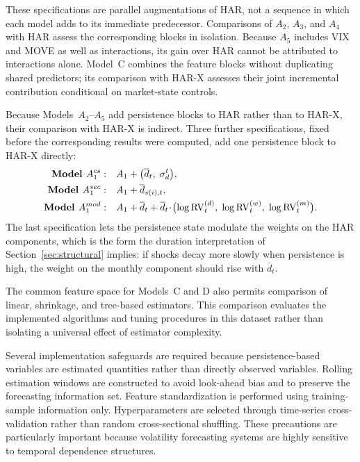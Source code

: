 \documentclass[jrfm,article,submit,moreauthors,pdftex]{Definitions/mdpi}
\begin{document}
These specifications are parallel augmentations of HAR, not a sequence in
which each model adds to its immediate predecessor. Comparisons of $A_2$,
$A_3$, and $A_4$ with HAR assess the corresponding blocks in isolation.
Because $A_5$ includes VIX and MOVE as well as interactions, its gain over
HAR cannot be attributed to interactions alone. Model~C combines the
feature blocks without duplicating shared predictors; its comparison with
HAR-X assesses their joint incremental contribution conditional on
market-state controls.

Because Models~$A_2$--$A_5$ add persistence blocks to HAR rather than to
HAR-X, their comparison with HAR-X is indirect. Three further
specifications, fixed before the corresponding results were computed, add
one persistence block to HAR-X directly:
\begin{align}
  \textbf{Model }A_1^{cs}:\quad &A_1 + \bigl(\overline{d}_t,\;\sigma_d^t\bigr),
  \notag\\
  \textbf{Model }A_1^{sec}:\quad &A_1 + \overline{d}_{s(i),t},
  \notag\\
  \textbf{Model }A_1^{mod}:\quad &A_1 + \overline{d}_t
  + \overline{d}_t\!\cdot\!\bigl(\log\mathrm{RV}^{(d)}_t,\;
  \log\mathrm{RV}^{(w)}_t,\;\log\mathrm{RV}^{(m)}_t\bigr).
  \notag
\end{align}
The last specification lets the persistence state modulate the weights on
the HAR components, which is the form the duration interpretation of
Section~\ref{sec:structural} implies: if shocks decay more slowly when
persistence is high, the weight on the monthly component should rise with
$\overline d_t$.

The common feature space for Models~C and D also permits comparison of
linear, shrinkage, and tree-based estimators. This comparison evaluates the
implemented algorithms and tuning procedures in this dataset rather than
isolating a universal effect of estimator complexity.

Several implementation safeguards are required because persistence-based
variables are estimated quantities rather than directly observed variables.
Rolling estimation windows are constructed to avoid look-ahead bias and to
preserve the forecasting information set. Feature standardization is
performed using training-sample information only. Hyperparameters are
selected through time-series cross-validation rather than random
cross-sectional shuffling. These precautions are particularly important
because volatility forecasting systems are highly sensitive to temporal
dependence structures.
\end{document}
